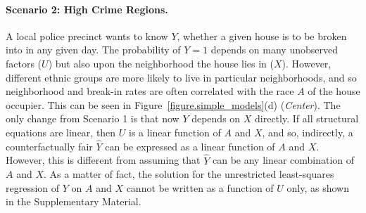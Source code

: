 \paragraph{Scenario 2: High Crime Regions.}
A local police precinct wants to know $Y$, whether a given house is to
be broken into in any given day. The probability of $Y = 1$ depends on
many unobserved factors ($U$) but also upon the neighborhood the house
lies in ($X$). However, different ethnic groups are more likely to
live in particular neighborhoods, and so neighborhood and break-in
rates are often correlated with the race $A$ of the house
occupier. This can be seen in Figure~\ref{figure.simple_models}(d)
(\emph{Center}). The only change from Scenario 1 is that now $Y$
depends on $X$ directly. If all structural equations are linear, then
$U$ is a linear function of $A$ and $X$, and so, indirectly, a
counterfactually fair $\hat Y$ can be expressed as a linear function
of $A$ and $X$. However, this is different from assuming that $\hat Y$ can be
any linear combination of $A$ and $X$. As a matter of fact, the solution for the
unrestricted least-squares regression of $Y$ on $A$ and $X$ cannot be
written as a function of $U$ only, as shown in the Supplementary Material.

